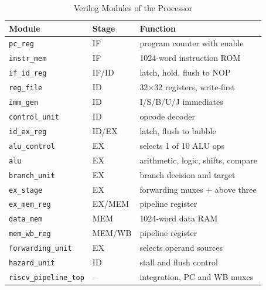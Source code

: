 \begin{table}[!t]
\centering
\caption{Verilog Modules of the Processor}
\label{tab:modules}
\setlength{\tabcolsep}{3pt}
\renewcommand{\arraystretch}{1.05}
\begin{tabular}{@{}lll@{}}
\toprule
\textbf{Module} & \textbf{Stage} & \textbf{Function} \\ \midrule
\texttt{pc\_reg}          & IF  & program counter with enable \\
\texttt{instr\_mem}       & IF  & 1024-word instruction ROM \\
\texttt{if\_id\_reg}      & IF/ID & latch, hold, flush to NOP \\
\texttt{reg\_file}        & ID  & 32$\times$32 registers, write-first \\
\texttt{imm\_gen}         & ID  & I/S/B/U/J immediates \\
\texttt{control\_unit}    & ID  & opcode decoder \\
\texttt{id\_ex\_reg}      & ID/EX & latch, flush to bubble \\
\texttt{alu\_control}     & EX  & selects 1 of 10 ALU ops \\
\texttt{alu}              & EX  & arithmetic, logic, shifts, compare \\
\texttt{branch\_unit}     & EX  & branch decision and target \\
\texttt{ex\_stage}        & EX  & forwarding muxes + above three \\
\texttt{ex\_mem\_reg}     & EX/MEM & pipeline register \\
\texttt{data\_mem}        & MEM & 1024-word data RAM \\
\texttt{mem\_wb\_reg}     & MEM/WB & pipeline register \\
\texttt{forwarding\_unit} & EX  & selects operand sources \\
\texttt{hazard\_unit}     & ID  & stall and flush control \\
\texttt{riscv\_pipeline\_top} & -- & integration, PC and WB muxes \\ \bottomrule
\end{tabular}
\end{table}

